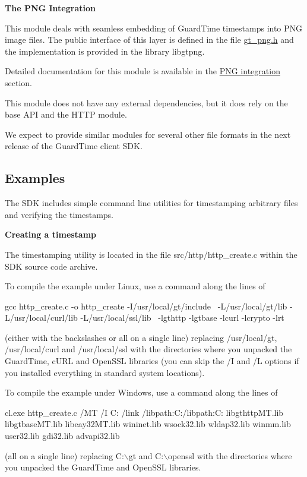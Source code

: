 {\bfseries The PNG Integration}

This module deals with seamless embedding of GuardTime timestamps into PNG image files. The public interface of this layer is defined in the file {\ttfamily \hyperlink{gt__png_8h}{gt\_\-png.h}} and the implementation is provided in the library {\ttfamily libgtpng}.

Detailed documentation for this module is available in the \hyperlink{group__png}{PNG integration} section.

This module does not have any external dependencies, but it does rely on the base API and the HTTP module.

We expect to provide similar modules for several other file formats in the next release of the GuardTime client SDK.

\subsection*{Examples}

The SDK includes simple command line utilities for timestamping arbitrary files and verifying the timestamps.

{\bfseries Creating a timestamp}

The timestamping utility is located in the file {\ttfamily src/http/http\_\-create.c} within the SDK source code archive.

To compile the example under Linux, use a command along the lines of 
\begin{DoxyCode}
        gcc http_create.c -o http_create -I/usr/local/gt/include \
        -L/usr/local/gt/lib -L/usr/local/curl/lib -L/usr/local/ssl/lib \
        -lgthttp -lgtbase -lcurl -lcrypto -lrt
\end{DoxyCode}
 (either with the backslashes or all on a single line) replacing {\ttfamily /usr/local/gt}, {\ttfamily /usr/local/curl} and {\ttfamily /usr/local/ssl} with the directories where you unpacked the GuardTime, cURL and OpenSSL libraries (you can skip the {\ttfamily /I} and {\ttfamily /L} options if you installed everything in standard system locations).

To compile the example under Windows, use a command along the lines of 
\begin{DoxyCode}
        cl.exe http_create.c /MT /I C:\gt
        /link /libpath:C:\gt\lib /libpath:C:\openssl\lib
        libgthttpMT.lib libgtbaseMT.lib libeay32MT.lib wininet.lib
        wsock32.lib wldap32.lib winmm.lib user32.lib gdi32.lib advapi32.lib
\end{DoxyCode}
 (all on a single line) replacing {\ttfamily C:$\backslash$gt} and {\ttfamily C:$\backslash$openssl} with the directories where you unpacked the GuardTime and OpenSSL libraries.

